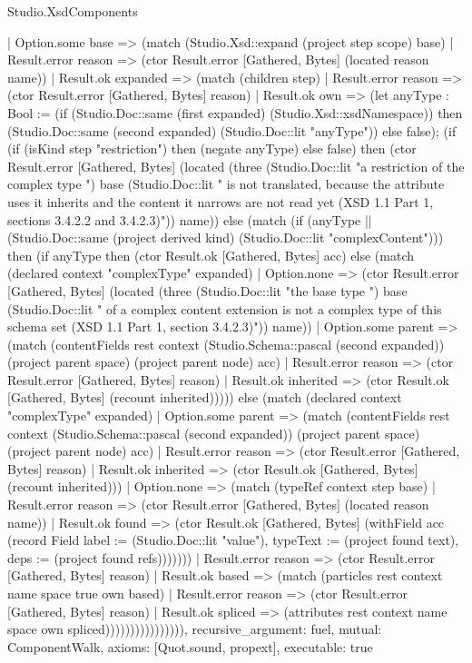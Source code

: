 \begin{lexlean}{Studio.XsdComponents}
\begin{semanticmodule}
{                | Option.some base => (match (Studio.Xsd::expand (project step scope) base)
                  | Result.error reason => (ctor Result.error [Gathered, Bytes] (located reason name))
                  | Result.ok expanded => (match (children step)
                    | Result.error reason => (ctor Result.error [Gathered, Bytes] reason)
                    | Result.ok own => (let anyType : Bool := (if (Studio.Doc::same (first expanded) (Studio.Xsd::xsdNamespace)) then (Studio.Doc::same (second expanded) (Studio.Doc::lit "anyType")) else false); (if (if (isKind step "restriction") then (negate anyType) else false) then (ctor Result.error [Gathered, Bytes] (located (three (Studio.Doc::lit "a restriction of the complex type ") base (Studio.Doc::lit " is not translated, because the attribute uses it inherits and the content it narrows are not read yet (XSD 1.1 Part 1, sections 3.4.2.2 and 3.4.2.3)")) name)) else (match (if (anyType || (Studio.Doc::same (project derived kind) (Studio.Doc::lit "complexContent"))) then (if anyType then (ctor Result.ok [Gathered, Bytes] acc) else (match (declared context "complexType" expanded)
                      | Option.none => (ctor Result.error [Gathered, Bytes] (located (three (Studio.Doc::lit "the base type ") base (Studio.Doc::lit " of a complex content extension is not a complex type of this schema set (XSD 1.1 Part 1, section 3.4.2.3)")) name))
                      | Option.some parent => (match (contentFields rest context (Studio.Schema::pascal (second expanded)) (project parent space) (project parent node) acc)
                        | Result.error reason => (ctor Result.error [Gathered, Bytes] reason)
                        | Result.ok inherited => (ctor Result.ok [Gathered, Bytes] (recount inherited))))) else (match (declared context "complexType" expanded)
                      | Option.some parent => (match (contentFields rest context (Studio.Schema::pascal (second expanded)) (project parent space) (project parent node) acc)
                        | Result.error reason => (ctor Result.error [Gathered, Bytes] reason)
                        | Result.ok inherited => (ctor Result.ok [Gathered, Bytes] (recount inherited)))
                      | Option.none => (match (typeRef context step base)
                        | Result.error reason => (ctor Result.error [Gathered, Bytes] (located reason name))
                        | Result.ok found => (ctor Result.ok [Gathered, Bytes] (withField acc (record Field {label := (Studio.Doc::lit "value"), typeText := (project found text), deps := (project found refs)}))))))
                      | Result.error reason => (ctor Result.error [Gathered, Bytes] reason)
                      | Result.ok based => (match (particles rest context name space true own based)
                        | Result.error reason => (ctor Result.error [Gathered, Bytes] reason)
                        | Result.ok spliced => (attributes rest context name space own spliced)))))))))))))))),
  recursive_argument: fuel,
  mutual: ComponentWalk,
  axioms: [Quot.sound, propext],
  executable: true
}


\end{semanticmodule}
\end{lexlean}
